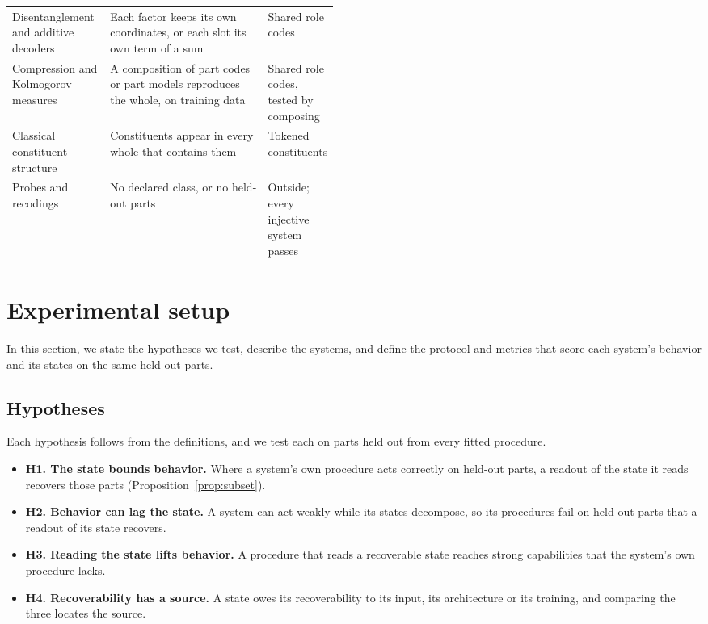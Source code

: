 \documentclass[10pt]{article}
\theoremstyle{plain}
\theoremstyle{remark}
\begin{document}
\begin{table}[t]
\begin{tabularx}{\linewidth}{@{}P{0.30\linewidth}YP{0.17\linewidth}@{}}
    Disentanglement and additive decoders \citep{bengio2013,lachapelle2023,wiedemer2024} & Each factor keeps its own coordinates, or each slot its own term of a sum & Shared role codes \\
    Compression and Kolmogorov measures \citep{andreas2019,elmoznino2024,elmoznino2026} & A composition of part codes or part models reproduces the whole, on training data & Shared role codes, tested by composing \\
    \addlinespace
    Classical constituent structure \citep{fodor1988} & Constituents appear in every whole that contains them & Tokened constituents \\
    \addlinespace
    Probes \citep{belinkov2022,hewitt2019} and recodings \citep{zadrozny1994} & No declared class, or no held-out parts & Outside; every injective system passes \\
    \bottomrule
  \end{tabularx}
\end{table}

\section{Experimental setup}
\label{sec:experiments}

In this section, we state the hypotheses we test, describe the systems, and define the protocol and metrics that score each system's behavior and its states on the same held-out parts.

\subsection{Hypotheses}

Each hypothesis follows from the definitions, and we test each on parts held out from every fitted procedure.
\begin{itemize}
  \item \textbf{H1. The state bounds behavior.} Where a system's own procedure acts correctly on held-out parts, a readout of the state it reads recovers those parts (Proposition~\ref{prop:subset}).
  \item \textbf{H2. Behavior can lag the state.} A system can act weakly while its states decompose, so its procedures fail on held-out parts that a readout of its state recovers.
  \item \textbf{H3. Reading the state lifts behavior.} A procedure that reads a recoverable state reaches strong capabilities that the system's own procedure lacks.
  \item \textbf{H4. Recoverability has a source.} A state owes its recoverability to its input, its architecture or its training, and comparing the three locates the source.
\end{itemize}
\end{document}
